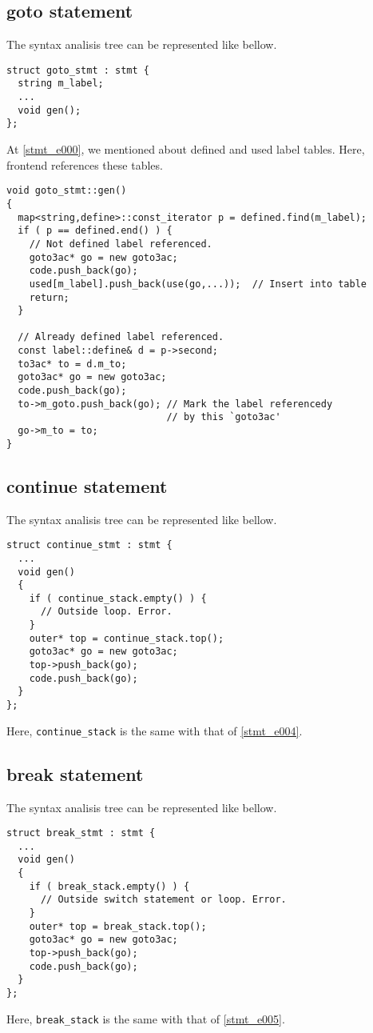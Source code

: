 \subsection{goto statement}
\label{stmt_e001}
The syntax analisis tree can be represented like bellow.
\begin{verbatim}
struct goto_stmt : stmt {
  string m_label;
  ...
  void gen();
};
\end{verbatim}
At \ref{stmt_e000}, we mentioned about defined and used label tables.
Here, frontend references these tables.
\begin{verbatim}
void goto_stmt::gen()
{
  map<string,define>::const_iterator p = defined.find(m_label);
  if ( p == defined.end() ) {
    // Not defined label referenced.
    goto3ac* go = new goto3ac;
    code.push_back(go);
    used[m_label].push_back(use(go,...));  // Insert into table
    return;
  }

  // Already defined label referenced.
  const label::define& d = p->second;
  to3ac* to = d.m_to;
  goto3ac* go = new goto3ac;
  code.push_back(go);
  to->m_goto.push_back(go); // Mark the label referencedy
                            // by this `goto3ac'
  go->m_to = to;
}
\end{verbatim}

\subsection{continue statement}

The syntax analisis tree can be represented like bellow.
\begin{verbatim}
struct continue_stmt : stmt {
  ...
  void gen()
  {
    if ( continue_stack.empty() ) {
      // Outside loop. Error.
    }
    outer* top = continue_stack.top();
    goto3ac* go = new goto3ac;
    top->push_back(go);
    code.push_back(go);
  }
};
\end{verbatim}
Here, {\tt{continue\_stack}} is the same
with that of \ref{stmt_e004}. 

\subsection{break statement}

The syntax analisis tree can be represented like bellow.
\begin{verbatim}
struct break_stmt : stmt {
  ...
  void gen()
  {
    if ( break_stack.empty() ) {
      // Outside switch statement or loop. Error.
    }
    outer* top = break_stack.top();
    goto3ac* go = new goto3ac;
    top->push_back(go);
    code.push_back(go);
  }
};
\end{verbatim}
Here, {\tt{break\_stack}} is the same
with that of \ref{stmt_e005}.

